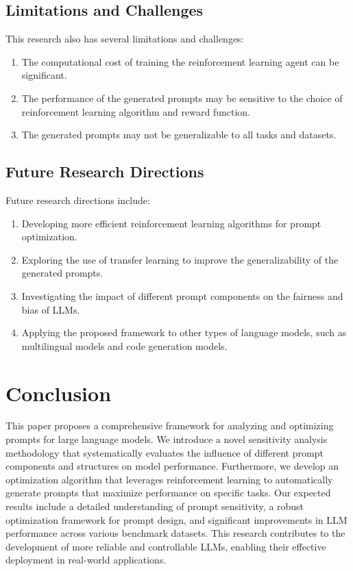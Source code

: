 \documentclass{article}
\begin{document}
\subsection{Limitations and Challenges}
This research also has several limitations and challenges:
\begin{enumerate}
    \item The computational cost of training the reinforcement learning agent can be significant.
    \item The performance of the generated prompts may be sensitive to the choice of reinforcement learning algorithm and reward function.
    \item The generated prompts may not be generalizable to all tasks and datasets.
\end{enumerate}

\subsection{Future Research Directions}
Future research directions include:
\begin{enumerate}
    \item Developing more efficient reinforcement learning algorithms for prompt optimization.
    \item Exploring the use of transfer learning to improve the generalizability of the generated prompts.
    \item Investigating the impact of different prompt components on the fairness and bias of LLMs.
    \item Applying the proposed framework to other types of language models, such as multilingual models and code generation models.
\end{enumerate}

\section{Conclusion}
\label{sec:conclusion}

This paper proposes a comprehensive framework for analyzing and optimizing prompts for large language models. We introduce a novel sensitivity analysis methodology that systematically evaluates the influence of different prompt components and structures on model performance. Furthermore, we develop an optimization algorithm that leverages reinforcement learning to automatically generate prompts that maximize performance on specific tasks. Our expected results include a detailed understanding of prompt sensitivity, a robust optimization framework for prompt design, and significant improvements in LLM performance across various benchmark datasets. This research contributes to the development of more reliable and controllable LLMs, enabling their effective deployment in real-world applications.
\end{document}
